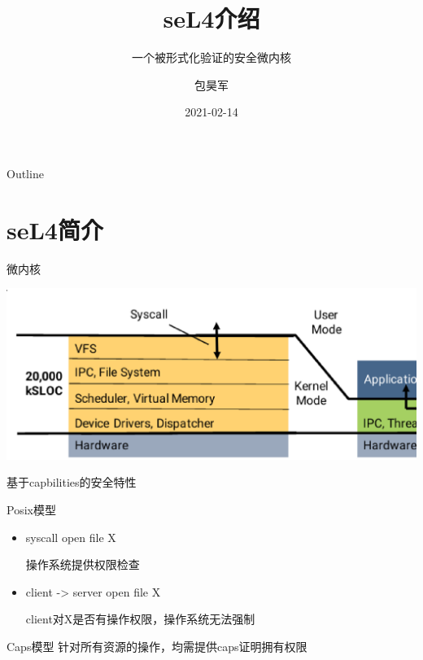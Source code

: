 \documentclass[presentation,dvipdfmx,CJKbookmarks]{beamer}
\date{2021-02-14}
\begin{document}
\begin{CJK*}{UTF8}{simsun}

\title{seL4\thinspace 介绍}
\subtitle{一个被形式化验证的安全微内核}
\author{包昊军}

\maketitle
\begin{frame}{Outline}
\tableofcontents
\end{frame}

\CJKtilde

\section{seL4\thinspace 简介}
\label{sec:org4af9569}
\begin{frame}[label={sec:org4eb460e}]{微内核}
\begin{center}
\includegraphics[width=.9\linewidth]{./images/micro-kernel-structure.ps}
\end{center}
\end{frame}

\begin{frame}[label={sec:orga023638}]{基于\thinspace capbilities\thinspace 的安全特性}
\begin{block}{Posix\thinspace 模型}
\begin{itemize}
\item syscall open file X

操作系统提供权限检查
\item client -> server open file X

client\thinspace 对\thinspace X\thinspace 是否有操作权限，操作系统无法强制
\end{itemize}
\end{block}

\begin{block}{Caps\thinspace 模型}
针对所有资源的操作，均需提供\thinspace caps\thinspace 证明拥有权限
\end{block}
\end{frame}


\end{CJK*}
\end{document}
